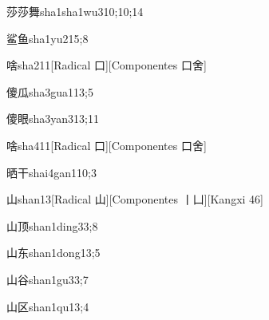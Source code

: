 \begin{verbete}{莎莎舞}{sha1sha1wu3}{10;10;14}
\end{verbete}

\begin{verbete}{鲨鱼}{sha1yu2}{15;8}
\end{verbete}

\begin{verbete}{啥}{sha2}{11}[Radical 口][Componentes 口舍]
\end{verbete}

\begin{verbete}{傻瓜}{sha3gua1}{13;5}
\end{verbete}

\begin{verbete}{傻眼}{sha3yan3}{13;11}
\end{verbete}

\begin{verbete}{啥}{sha4}{11}[Radical 口][Componentes 口舍]
\end{verbete}

\begin{verbete}{晒干}{shai4gan1}{10;3}
\end{verbete}

\begin{verbete}{山}{shan1}{3}[Radical 山][Componentes 丨凵][Kangxi 46]
\end{verbete}

\begin{verbete}{山顶}{shan1ding3}{3;8}
\end{verbete}

\begin{verbete}{山东}{shan1dong1}{3;5}
\end{verbete}

\begin{verbete}{山谷}{shan1gu3}{3;7}
\end{verbete}

\begin{verbete}{山区}{shan1qu1}{3;4}
\end{verbete}

